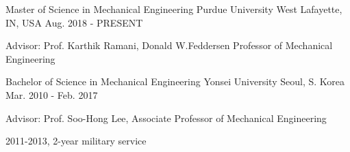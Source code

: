 


\begin{cventries}


    \cventry
    {Master of Science in Mechanical Engineering} %
    {Purdue University} %
    {West Lafayette, IN, USA} %
    {Aug. 2018 - PRESENT} %
    { %
    \begin{cvitems}
        \item {Advisor: Prof. Karthik Ramani, Donald W.Feddersen Professor of Mechanical Engineering}
    \end{cvitems}
    }

    \cventry
    {Bachelor of Science in Mechanical Engineering} %
    {Yonsei University} %
    {Seoul, S. Korea} %
    {Mar. 2010 - Feb. 2017} %
    { %
    \begin{cvitems}
        \item {Advisor: Prof. Soo-Hong Lee, Associate Professor of Mechanical Engineering}
        \item {2011-2013, 2-year military service}
    \end{cvitems}
    }

\end{cventries}